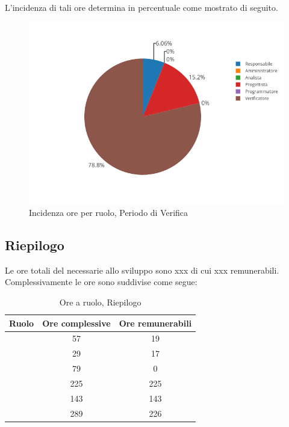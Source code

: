 L'incidenza di tali ore determina in percentuale come mostrato di seguito.
\begin{figure}[H]
	\centering
	\includegraphics[scale=0.6]{img/Validazione.png}
	\caption{Incidenza ore per ruolo, Periodo di Verifica}
\end{figure}

\subsection{Riepilogo}
Le ore totali del necessarie allo sviluppo sono xxx di cui xxx remunerabili. Complessivamente le ore sono suddivise come segue:

\begin{table}[H]
	\begin{center}
		\begin{tabular}{|c|c|c|}
			\hline
			\textbf{Ruolo}	& \textbf{Ore complessive} & \textbf{Ore remunerabili} \\
			\hline
			\Res	&	57	&	19	\\
			\hline
			\Amm	&	29	&	17	\\
			\hline
			\Ana	&	79	&	0	\\
			\hline
			\Prog	&	225	&	225	\\
			\hline
			\Progr	&	143	&	143	\\
			\hline
			\Ver	&	289	&	226	\\
			\hline
		\end{tabular}
	\end{center}
	\caption{Ore a ruolo, Riepilogo}
\end{table}

